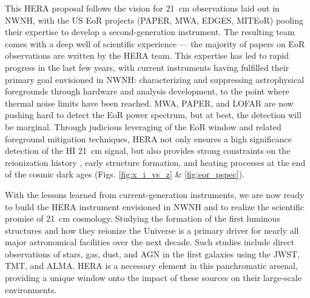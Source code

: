 \documentclass[preprint]{aastex}
\def\HI{{H{\small I }}}
\begin{document}
This HERA proposal follows the vision for 21~cm observations laid out in NWNH, with the US EoR
projects (PAPER, MWA, EDGES, MITEoR) pooling their expertise to develop a second-generation
instrument.  The resulting team comes with a deep well of scientific experience --- the majority of papers on EoR observations are written by the HERA team.
This expertise has led to rapid progress in the last few years, with current instruments having fulfilled their primary goal envisioned in NWNH: characterizing and suppressing astrophysical foregrounds through hardware and analysis development, to the point where thermal noise limits have been reached.  MWA, PAPER, and LOFAR are now pushing hard to detect the EoR power spectrum, but at best, the detection will be marginal.  Through judicious leveraging of the EoR window and related foreground mitigation techniques, HERA not only ensures a high significance detection of the \HI 21~cm signal, but also provides strong constraints on the reionization history \citep{pober_et_al2014}, early structure formation, and heating processes at the end of the
cosmic dark ages (Figs. \ref{fig:x_i_vs_z} \& \ref{fig:eor_pspec}).

With the lessons learned from current-generation instruments, we are now ready to build the HERA
instrument envisioned in NWNH and to realize the scientific promise of 21~cm
cosmology. Studying the formation of the first luminous structures 
and how they reionize the Universe is a primary driver for 
nearly all major astronomical facilities over the next decade.
Such studies include direct  observations of stars, gas, dust, and AGN in the
first galaxies using the JWST, TMT, and ALMA. HERA is 
a necessary element in this panchromatic arsenal, 
providing a unique window onto the impact of these sources on 
their large-scale environments.


\clearpage
\setcounter{page}{1}
\thispagestyle{empty}
%
%

%

\end{document}
